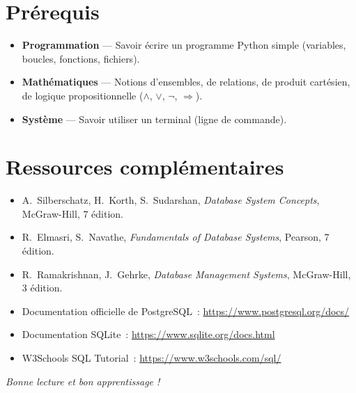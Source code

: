 \section*{Pr\'erequis}

\begin{itemize}
    \item \textbf{Programmation} --- Savoir \'ecrire un programme Python simple
          (variables, boucles, fonctions, fichiers).
    \item \textbf{Math\'ematiques} --- Notions d'ensembles, de relations,
          de produit cart\'esien, de logique propositionnelle
          ($\land$, $\lor$, $\neg$, $\Rightarrow$).
    \item \textbf{Syst\`eme} --- Savoir utiliser un terminal (ligne de commande).
\end{itemize}

\section*{Ressources compl\'ementaires}

\begin{itemize}
    \item A.~Silberschatz, H.~Korth, S.~Sudarshan, \emph{Database System Concepts},
          McGraw-Hill, 7\ieme{} \'edition.
    \item R.~Elmasri, S.~Navathe, \emph{Fundamentals of Database Systems},
          Pearson, 7\ieme{} \'edition.
    \item R.~Ramakrishnan, J.~Gehrke, \emph{Database Management Systems},
          McGraw-Hill, 3\ieme{} \'edition.
    \item Documentation officielle de PostgreSQL~: \url{https://www.postgresql.org/docs/}
    \item Documentation SQLite~: \url{https://www.sqlite.org/docs.html}
    \item W3Schools SQL Tutorial~: \url{https://www.w3schools.com/sql/}
\end{itemize}

\vfill
\begin{flushright}
\textit{Bonne lecture et bon apprentissage !}
\end{flushright}
